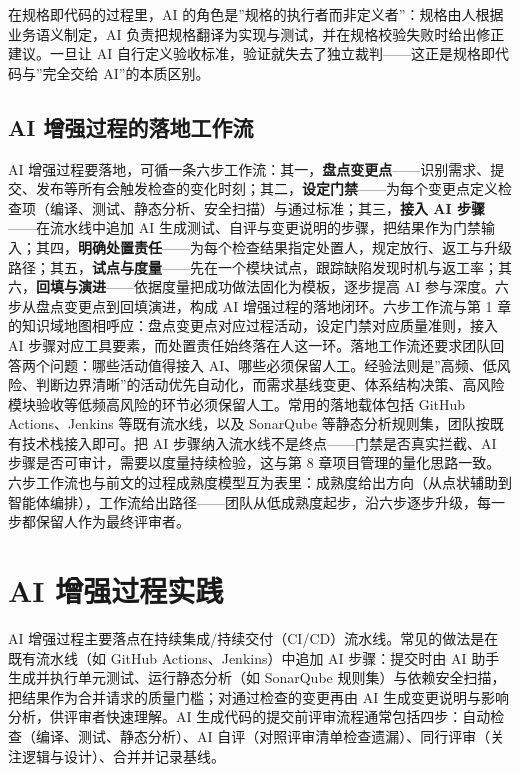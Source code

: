 \documentclass[12pt,a4paper,twoside,openany]{ctexbook}
\numberwithin{figure}{chapter}
\numberwithin{table}{chapter}
\begin{document}
在规格即代码的过程里，AI
的角色是''规格的执行者而非定义者''：规格由人根据业务语义制定，AI
负责把规格翻译为实现与测试，并在规格校验失败时给出修正建议。一旦让 AI
自行定义验收标准，验证就失去了独立裁判------这正是规格即代码与''完全交给
AI''的本质区别。

\subsection{AI
增强过程的落地工作流}\label{ai-ux589eux5f3aux8fc7ux7a0bux7684ux843dux5730ux5de5ux4f5cux6d41}

AI
增强过程要落地，可循一条六步工作流：其一，\textbf{盘点变更点}------识别需求、提交、发布等所有会触发检查的变化时刻；其二，\textbf{设定门禁}------为每个变更点定义检查项（编译、测试、静态分析、安全扫描）与通过标准；其三，\textbf{接入
AI 步骤}------在流水线中追加 AI
生成测试、自评与变更说明的步骤，把结果作为门禁输入；其四，\textbf{明确处置责任}------为每个检查结果指定处置人，规定放行、返工与升级路径；其五，\textbf{试点与度量}------先在一个模块试点，跟踪缺陷发现时机与返工率；其六，\textbf{回填与演进}------依据度量把成功做法固化为模板，逐步提高
AI 参与深度。六步从盘点变更点到回填演进，构成 AI
增强过程的落地闭环。六步工作流与第 1
章的知识域地图相呼应：盘点变更点对应过程活动，设定门禁对应质量准则，接入
AI
步骤对应工具要素，而处置责任始终落在人这一环。落地工作流还要求团队回答两个问题：哪些活动值得接入
AI、哪些必须保留人工。经验法则是''高频、低风险、判断边界清晰''的活动优先自动化，而需求基线变更、体系结构决策、高风险模块验收等低频高风险的环节必须保留人工。常用的落地载体包括
GitHub Actions、Jenkins 等既有流水线，以及 SonarQube
等静态分析规则集，团队按既有技术栈接入即可。把 AI
步骤纳入流水线不是终点------门禁是否真实拦截、AI
步骤是否可审计，需要以度量持续检验，这与第 8
章项目管理的量化思路一致。六步工作流也与前文的过程成熟度模型互为表里：成熟度给出方向（从点状辅助到智能体编排），工作流给出路径------团队从低成熟度起步，沿六步逐步升级，每一步都保留人作为最终评审者。

\section{AI 增强过程实践}\label{ai-ux589eux5f3aux8fc7ux7a0bux5b9eux8df5}

AI
增强过程主要落点在持续集成/持续交付（CI/CD）流水线。常见的做法是在既有流水线（如
GitHub Actions、Jenkins）中追加 AI 步骤：提交时由 AI
助手生成并执行单元测试、运行静态分析（如 SonarQube
规则集）与依赖安全扫描，把结果作为合并请求的质量门槛；对通过检查的变更再由
AI 生成变更说明与影响分析，供评审者快速理解。AI
生成代码的提交前评审流程通常包括四步：自动检查（编译、测试、静态分析）、AI
自评（对照评审清单检查遗漏）、同行评审（关注逻辑与设计）、合并并记录基线。
\end{document}
